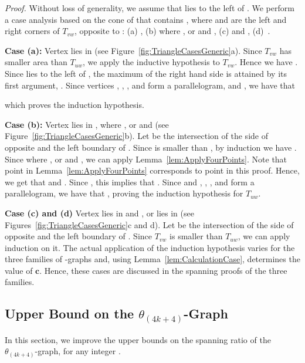 \documentclass[12pt]{article}
\newenvironment{proof}{\emph{Proof.}}{\hfill \\}
\newcommand{\Graph}[1]{\ensuremath{\theta_{(4 k + #1)}}-Graph\xspace}
\newcommand{\graph}[1]{\ensuremath{\theta_{(4 k + #1)}}-graph\xspace}
\newcommand{\canon}[2]{\ensuremath{T_{#1 #2}}}
\newcommand{\const}{\ensuremath{\boldsymbol{c}}\xspace}
\begin{document}
\begin{proof}
  Without loss of generality, we assume that  lies to the left of . We perform a case analysis based on the cone of  that contains , where  and  are the left and right corners of \canon{v}{w}, opposite to : (a) , (b)  where , or  and , (c)  and , \mbox{(d) }. 

  \textbf{Case (a):} Vertex  lies in  (see Figure~\ref{fig:TriangleCasesGeneric}a). Since \canon{v}{w} has smaller area than \canon{u}{w}, we apply the inductive hypothesis to \canon{v}{w}. Hence we have . Since  lies to the left of , the maximum of the right hand side is attained by its first argument, . Since vertices , , , and  form a parallelogram, and , we have that
  
  which proves the induction hypothesis. 

  \textbf{Case (b):} Vertex  lies in , where , or  and  (see Figure~\ref{fig:TriangleCasesGeneric}b). Let  be the intersection of the side of  opposite  and the left boundary of . Since  is smaller than , by induction we have . Since  where , or  and , we can apply Lemma~\ref{lem:ApplyFourPoints}. Note that point  in Lemma~\ref{lem:ApplyFourPoints} corresponds to point  in this proof. Hence, we get that  and . Since , this implies that  . Since  and , , , and  form a parallelogram, we have that , proving the induction hypothesis for \canon{u}{w}.

  \textbf{Case (c) and (d)} Vertex  lies in  and , or  lies in  (see Figures~\ref{fig:TriangleCasesGeneric}c and d). Let  be the intersection of the side of  opposite  and the left boundary of . Since \canon{v}{w} is smaller than \canon{u}{w}, we can apply induction on it. The actual application of the induction hypothesis varies for the three families of -graphs and, using Lemma~\ref{lem:CalculationCase}, determines the value of \const. Hence, these cases are discussed in the spanning proofs of the three families. 
\end{proof}


\subsection{Upper Bound on the \Graph{4}}
\label{subsec:Theta4k+4}
In this section, we improve the upper bounds on the spanning ratio of the \graph{4}, for any integer . 
\end{document}
